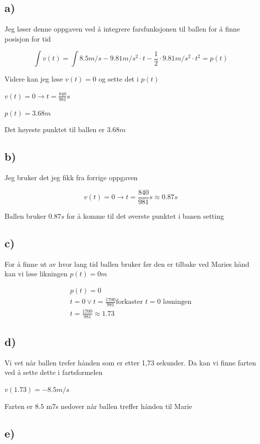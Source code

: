 \documentclass{article}
\begin{document}
\subsection{a)}

Jeg løser denne oppgaven ved å integrere farsfunksjonen til ballen for å finne posisjon for tid

$$\int v(t) = \int 8.5 m/s - 9.81 m/s^2 \cdot t - \frac{1}{2} \cdot 9.81 m/s^2 \cdot t^2 = p(t)$$

Videre kan jeg løse $v(t)=0$ og sette det i $p(t)$

$v(t) = 0 \rightarrow t = \frac{840}{981}s$

$p(t)=3.68 m$

Det høyeste punktet til ballen er $3.68m$

\subsection{b)} 

Jeg bruker det jeg fikk fra forrige oppgaven

$$v(t) = 0 \rightarrow t = \frac{840}{981}s \approx 0.87s$$

Ballen bruker $0.87s$ for å komme til det øverste punktet i banen setting

\subsection{c)}

For å finne ut av hvor lang tid ballen bruker før den er tilbake ved Maries hånd kan vi løse likningen $p(t)=0m$

\begin{align*}
    p(t) = 0 \\
    t = 0 \lor t = \frac{1700}{981} \text{forkaster $t=0$ løsningen} \\
    t = \frac{1700}{981} \approx 1.73
\end{align*}

\subsection{d)}

Vi vet når ballen trefer hånden som er etter 1,73 sekunder. 
Da kan vi finne farten ved å sette dette i fartsformelen

$v(1.73) = -8.5 m/s$

Farten er $8.5$ m7s nedover når ballen treffer hånden til Marie

\subsection{e)}
\end{document}
